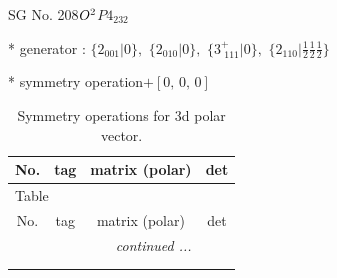 \documentclass[fleqn,8pt]{jsarticle}
\begin{document}
\setcounter{MaxMatrixCols}{32}

\renewcommand{\tablename}{Table~}
\renewcommand{\figurename}{Figure~}
\begin{center}
\LARGE
SG No. 208\quad$O_{\rm }^{2}$\quad$P4_232$\quad[ cubic ]
\end{center}

* generator : $\{2{}_{001}|0\},\,\,\{2{}_{010}|0\},\,\,\{3^{+}_{\,\,111}|0\},\,\,\{2{}_{110}|\frac{1}{2} \frac{1}{2} \frac{1}{2}\}$

* symmetry operation\quad$+\left[ 0,\, 0,\, 0 \right]$
\renewcommand{\arraystretch}{1.3}
\begin{longtable}{cccc}
\caption{Symmetry operations for 3d polar vector.}
 \\
 \hline \hline
No. & tag & matrix (polar) & det \\ \hline \endfirsthead

\multicolumn{3}{l}{\tablename\ \thetable{}} \\
 \hline \hline
No. & tag & matrix (polar) & det \\ \hline \endhead

 \hline \hline
\multicolumn{3}{r}{\footnotesize\it continued ...} \\ \endfoot

 \hline \hline
\multicolumn{3}{r}{} \\ \endlastfoot


\end{longtable}
\end{document}
